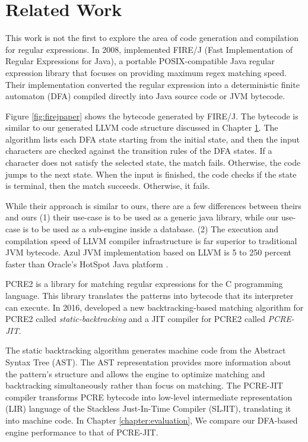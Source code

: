 \chapter{Related Work}\label{chapter:related_work}
This work is not the first to explore the area of code generation and compilation for regular expressions. In 2008, \citet{firejpaper} implemented FIRE/J (Fast Implementation of Regular Expressions for Java), a portable POSIX-compatible Java regular expression library that focuses on providing maximum regex matching speed. Their implementation converted the regular expression into a deterministic finite automaton (DFA) compiled directly into Java source code or JVM bytecode.

Figure \ref{fig:firejpaper} shows the bytecode generated by FIRE/J. The bytecode is similar to our generated LLVM code structure discussed in Chapter \ref{chapter:related_work}. The algorithm lists each DFA state starting from the initial state, and then the input characters are checked against the transition rules of the DFA states. If a character does not satisfy the selected state, the match fails. Otherwise, the code jumps to the next state. When the input is finished, the code checks if the state is terminal, then the match succeeds. Otherwise, it fails.

While their approach is similar to ours, there are a few differences between theirs and ours (1) their use-case is to be used as a generic java library, while our use-case is to be used as a sub-engine inside a database. (2) The execution and compilation speed of LLVM compiler infrastructure is far superior to traditional JVM bytecode. Azul JVM implementation based on LLVM is 5 to 250 percent faster than Oracle’s HotSpot Java platform \cite{azul}.

PCRE2 \cite{pcre2}  is a library for matching regular expressions for the C programming language. This library translates the patterns into bytecode that its interpreter can execute. In 2016, \citet{pcre2_jit} developed a new backtracking-based matching algorithm for PCRE2 called \textit{static-backtracking} and a JIT compiler for PCRE2 called \textit{PCRE-JIT}.

The static backtracking algorithm generates machine code from the Abstract Syntax Tree (AST). The AST representation provides more information about the pattern's structure and allows the engine to optimize matching and backtracking simultaneously rather than focus on matching. The PCRE-JIT compiler transforms PCRE bytecode into low-level intermediate representation (LIR) language of the Stackless Just-In-Time Compiler (SLJIT), translating it into machine code. In Chapter \ref{chapter:evaluation}, We compare our DFA-based engine performance to that of PCRE-JIT.

